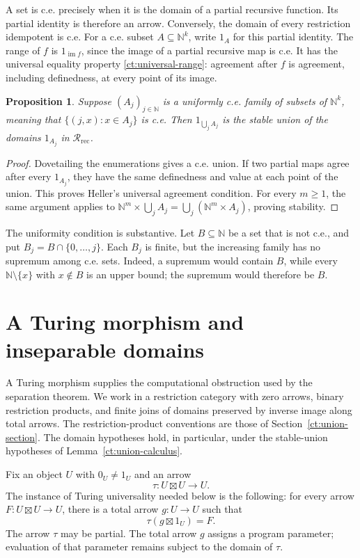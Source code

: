 \documentclass[11pt]{article}
\newtheorem{proposition}[theorem]{Proposition}
\theoremstyle{definition}
\theoremstyle{remark}
\newcommand{\R}{\mathscr R}
\newcommand{\N}{\mathbb N}
\begin{document}
A set is c.e. precisely when it is the domain of a partial recursive
function. Its partial identity is therefore an arrow. Conversely, the
domain of every restriction idempotent is c.e. For a c.e. subset
$A\subseteq\N^k$, write $1_A$ for this partial identity. The range of
$f$ is $1_{\operatorname{im}f}$, since the image of a partial recursive
map is c.e. It has the universal equality property
\eqref{ct:universal-range}: agreement after $f$ is agreement, including
definedness, at every point of its image.

\begin{proposition}\label{num:uniform-unions}
Suppose $(A_j)_{j\in\N}$ is a uniformly c.e. family of subsets of
$\N^k$, meaning that $\{(j,x):x\in A_j\}$ is c.e. Then
$1_{\bigcup_j A_j}$ is the stable union of the domains $1_{A_j}$ in
$\R_{\mathrm{rec}}$.
\end{proposition}
\begin{proof}
Dovetailing the enumerations gives a c.e. union. If two partial maps agree
after every $1_{A_j}$, they have the same definedness and value at each
point of the union. This proves Heller's universal agreement condition.
For every $m\ge1$, the same argument applies to
$\N^m\times\bigcup_j A_j=\bigcup_j(\N^m\times A_j)$, proving stability.
\end{proof}

The uniformity condition is substantive. Let $B\subseteq\N$ be a set
that is not c.e., and put $B_j=B\cap\{0,\ldots,j\}$. Each $B_j$ is
finite, but the increasing family has no supremum among c.e. sets.
Indeed, a supremum would contain $B$, while every
$\N\setminus\{x\}$ with $x\notin B$ is an upper bound; the supremum
would therefore be $B$.


\section{A Turing morphism and inseparable domains}
\label{tur:section}

A Turing morphism supplies the computational obstruction used by the
separation theorem. We work in a restriction category with zero arrows,
binary restriction products, and finite joins of domains preserved by
inverse image along total arrows. The restriction-product conventions are
those of Section~\ref{ct:union-section}. The domain hypotheses hold, in
particular, under the stable-union hypotheses of
Lemma~\ref{ct:union-calculus}.

Fix an object $U$ with $0_U\ne1_U$ and an arrow
\[
 \tau:U\boxtimes U\longrightarrow U.
\]
The instance of Turing universality needed below is the following:
for every arrow $F:U\boxtimes U\to U$, there is a total arrow
$g:U\to U$ such that
\begin{equation}\label{tur:universality}
 \tau(g\boxtimes1_U)=F.
\end{equation}
The arrow $\tau$ may be partial. The total arrow $g$ assigns a program
parameter; evaluation of that parameter remains subject to the domain of
$\tau$.
\end{document}
